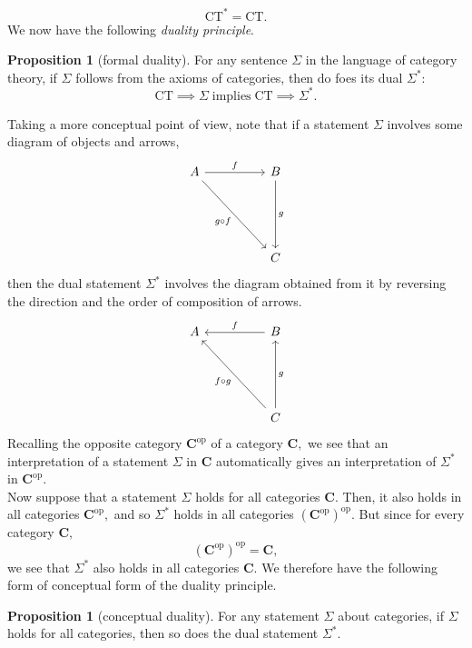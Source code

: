 \documentclass[11pt,leqno,landscape,semhelv]{seminar}
\theoremstyle{definition}
\newtheorem{prop}[thm]{Proposition}
\numberwithin{joke}{section}
\numberwithin{thm}{section}
\numberwithin{equation}{section}
\newcommand{\op}{^{\operatorname{op}}}
\begin{document}
\begin{equation*} 
  \text{CT}^* = \text{CT}.
\end{equation*}
We now have the following \emph{duality principle}.
%
\begin{prop}[formal duality]
  For any sentence $\Sigma$ in the language of category theory, if $\Sigma$ follows from the axioms of categories, then do foes its dual $\Sigma^*$:
  \begin{equation*} 
    \text{CT} \implies \Sigma \; \text{implies} \; \text{CT} \implies \Sigma^*.
  \end{equation*}
\end{prop}
Taking a more conceptual point of view, note that if a statement $\Sigma$ involves some diagram of objects and arrows,
\begin{equation*} 
  \begin{tikzcd}
    A \arrow[rr, "f"] \arrow[rrddd, "g\circ f"'] && B\arrow[ddd, "g"]\\
    &&\\&&\\
    &&C
  \end{tikzcd}
\end{equation*}
then the dual statement $\Sigma^*$ involves the diagram obtained from it by reversing the direction and the order of composition of arrows.
\begin{equation*} 
  \begin{tikzcd}
  A &  & B \arrow[ll, "f"']                            \\
    &  &                                               \\
    &  &                                               \\
    &  & C \arrow[lluuu, "f\circ g"] \arrow[uuu, "g"']
  \end{tikzcd}
\end{equation*}
Recalling the opposite category $\mathbf{C}\op$ of a category $\mathbf{C},$ we see that an interpretation of a statement $\Sigma$ in $\mathbf{C}$ automatically gives an interpretation of $\Sigma^*$ in $\mathbf{C}\op.$\\
Now suppose that a statement $\Sigma$ holds for all categories $\mathbf{C}.$ Then, it also holds in all categories $\mathbf{C}\op,$ and so $\Sigma^*$ holds in all categories $(\mathbf{C}\op)\op.$ But since for every category $\mathbf{C},$
\begin{equation*} 
  (\mathbf{C}\op)\op= \mathbf{C},
\end{equation*}
we see that $\Sigma^*$ also holds in all categories $\mathbf{C}.$ We therefore have the following form of conceptual form of the duality principle.
\begin{prop}[conceptual duality]
  For any statement $\Sigma$ about categories, if $\Sigma$ holds for all categories, then so does the dual statement $\Sigma^*.$
\end{prop}
%
\end{document}
